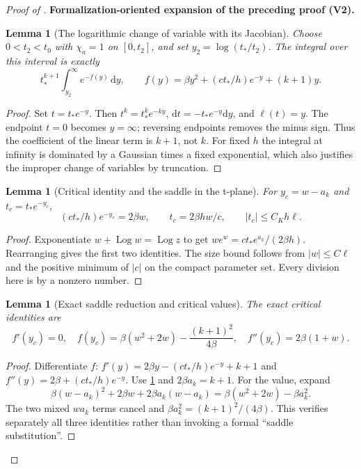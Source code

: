 \documentclass[11pt]{article}
\newtheorem{lemma}[theorem]{Lemma}
\newcommand{\formalisationparentid}{X}
\newenvironment{formalisationaddition}[1]{\par\medskip\begingroup\color{blue}\def\formalisationparentid{#1}\setcounter{formalizationsublemma}{0}\let\lemma\formalizationsublemma\let\endlemma\endformalizationsublemma
  \def\Eo{\mathcal E_h^\circ}\def\EE{\mathcal E_h}\def\phio{\phi_h^\circ}\def\phih{\phi_h}\def\Ho{H_h^{\rm atom}(v^\circ)}\def\Ha{H_h^{\rm atom}}\def\HL{H_h^{L}}\def\Dh{D_h}\def\Log{\operatorname{Log}}\def\ellh{\ell_h}\def\Gp{G_{p,h}}\def\Ast{A_{*,h}}\def\ahat{\widehat{\mathfrak a}_h}\def\ah{\mathfrak a_h}\def\rh{\widehat\rho_h}\def\deltah{\widehat\delta_h}\def\oldref##1{\textup{(##1)}}\def\interface##1{\par\noindent\textit{Analytical interface used here.} ##1\par}\def\finish{\par\noindent\textit{Conclusion of the formalization-oriented expansion.} }\par\noindent\textbf{Formalization-oriented expansion of the preceding proof (V2).}\par\smallskip
}{\par\endgroup\medskip
}
\begin{document}
\begin{proof}[Proof of ]
\begin{formalisationaddition}{D-T6.4}
\begin{lemma}[The logarithmic change of variable with its Jacobian]\label{sublemma:D6-4-log-change}
Choose $0<t_2<t_0$ with $\chi_a=1$ on $[0,t_2]$, and set
$y_2=\log(t_*/t_2)$. The integral over this interval is exactly
\[
 t_*^{k+1}\int_{y_2}^\infty e^{-f(y)}\,\mathrm dy,
 \qquad f(y)=\beta y^2+(ct_*/h)e^{-y}+(k+1)y.
\]
\end{lemma}
\begin{proof}
Set $t=t_*e^{-y}$. Then $t^k=t_*^ke^{-ky}$,
$\mathrm dt=-t_*e^{-y}\mathrm dy$, and $\ell(t)=y$.
The endpoint $t=0$ becomes $y=\infty$; reversing endpoints removes
the minus sign. Thus the coefficient of the linear term is $k+1$,
not $k$. For fixed $h$ the integral at infinity is dominated by a
Gaussian times a fixed exponential, which also justifies the improper
change of variables by truncation.
\end{proof}

\begin{lemma}[Critical identity and the saddle in the t-plane]\label{sublemma:D6-4-saddle-location}
For $y_c=w-a_k$ and $t_c=t_*e^{-y_c}$,
\[
 (ct_*/h)e^{-y_c}=2\beta w,\qquad
 t_c=2\beta hw/c,\qquad |t_c|\le C_Kh\ell.
\]
\end{lemma}
\begin{proof}
Exponentiate $w+\Log w=\Log z$ to get
$we^w=ct_*e^{a_k}/(2\beta h)$.
Rearranging gives the first two identities. The size bound follows
from $|w|\le C\ell$ and the positive minimum of $|c|$ on the compact
parameter set. Every division here is by a nonzero number.
\end{proof}

\begin{lemma}[Exact saddle reduction and critical values]\label{sublemma:D6-4-critical-calculation}
The exact critical identities are
\[
 f'(y_c)=0,\quad
 f(y_c)=\beta(w^2+2w)-\frac{(k+1)^2}{4\beta},\quad
 f''(y_c)=2\beta(1+w).
\]
\end{lemma}
\begin{proof}
Differentiate $f$: $f'(y)=2\beta y-(ct_*/h)e^{-y}+k+1$ and
$f''(y)=2\beta+(ct_*/h)e^{-y}$.
Use \ref{sublemma:D6-4-saddle-location} and $2\beta a_k=k+1$.
For the value, expand
\[
 \beta(w-a_k)^2+2\beta w+2\beta a_k(w-a_k)
       =\beta(w^2+2w)-\beta a_k^2.
\]
The two mixed $wa_k$ terms cancel and
$\beta a_k^2=(k+1)^2/(4\beta)$.
This verifies separately all three identities rather than invoking a
formal ``saddle substitution''.
\end{proof}


\end{formalisationaddition}
\end{proof}
\end{document}
